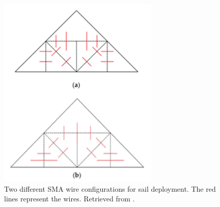 \begin{multicols}{2}
\begin{figure}[H]
    \centering
    \includegraphics[scale=0.38]{._figures/SMA wire configs.png}
    \caption[SMA wire configurations for solar sail deployment]{Two different SMA wire configurations for sail deployment. The red lines represent the wires. Retrieved from \cite{bovesecchi2019novel}.}
    \label{fig:Wire_configs}
\end{figure}



\end{multicols}
